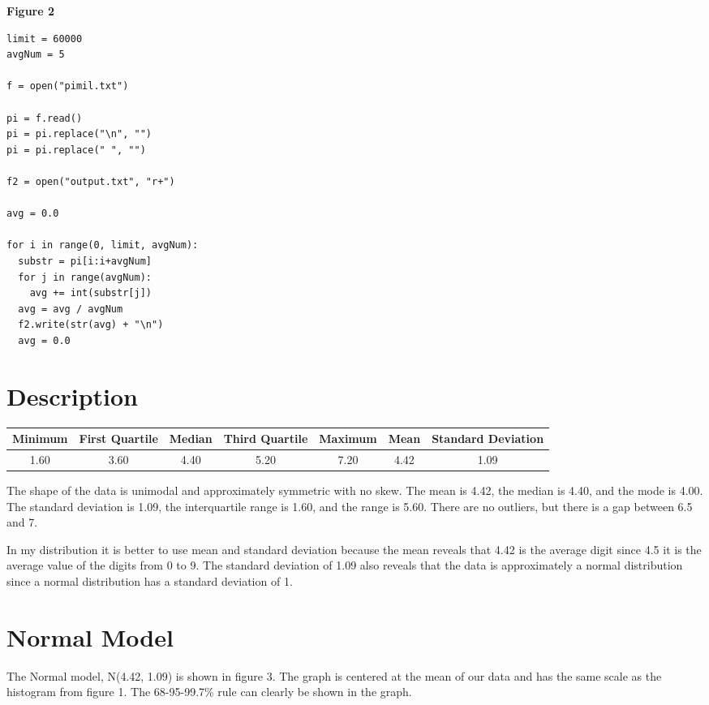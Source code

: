 \documentclass{article}
\begin{document}
\vspace{20px}

\centerline{\textbf{Figure 2}}

\begin{lstlisting}
limit = 60000
avgNum = 5

f = open("pimil.txt")

pi = f.read()
pi = pi.replace("\n", "")
pi = pi.replace(" ", "")

f2 = open("output.txt", "r+")

avg = 0.0

for i in range(0, limit, avgNum):
  substr = pi[i:i+avgNum]
  for j in range(avgNum):
    avg += int(substr[j])
  avg = avg / avgNum
  f2.write(str(avg) + "\n")
  avg = 0.0
\end{lstlisting}

\section{Description}
\begin{center}
  \begin{tabular}{||c | c | c | c | c | c | c||} 
  \hline\hline
  Minimum & First Quartile & Median & Third Quartile & Maximum & Mean & Standard Deviation\\ [0.5ex] 
  \hline
  1.60 & 3.60 & 4.40 & 5.20 & 7.20 & 4.42 & 1.09\\ 
  \hline\hline
  \end{tabular}
\end{center}
{The shape of the data is unimodal and approximately symmetric with no skew. The mean is 4.42, the median is 4.40, and the mode is 4.00. The standard deviation is 1.09, the interquartile range is 1.60, and the range is 5.60. There are no outliers, but there is a gap between 6.5 and 7.}

{In my distribution it is better to use mean and standard deviation because the mean reveals that 4.42 is the average digit since 4.5 it is the average value of the digits from 0 to 9. The standard deviation of 1.09 also reveals that the data is approximately a normal distribution since a normal distribution has a standard deviation of 1.}

\section{Normal Model}

{The Normal model, N(4.42, 1.09) is shown in figure 3. The graph is centered at the mean of our data and has the same scale as the histogram from figure 1. The 68-95-99.7\% rule can clearly be shown in the graph.}
\end{document}
